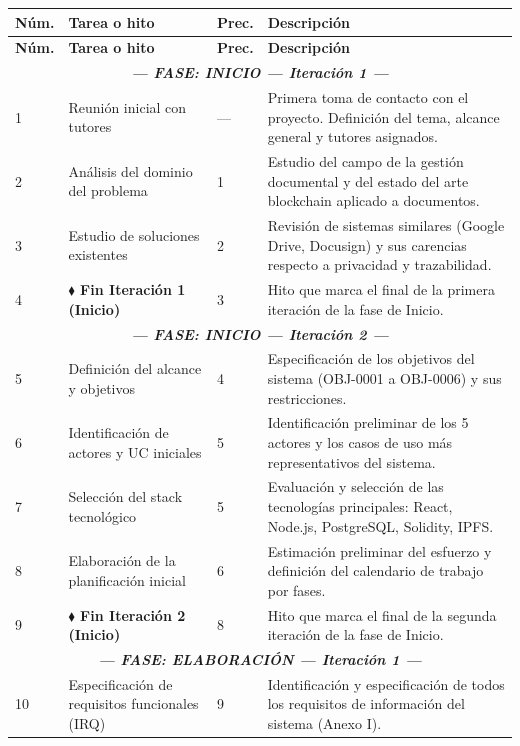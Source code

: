 \documentclass[11pt, a4paper]{article}
\begin{document}
\begin{longtable}{|p{1cm}|p{5.5cm}|p{1.5cm}|p{5.5cm}|}
\hline
\textbf{Núm.} & \textbf{Tarea o hito} & \textbf{Prec.} & \textbf{Descripción} \\
\hline
\endfirsthead
\hline
\textbf{Núm.} & \textbf{Tarea o hito} & \textbf{Prec.} & \textbf{Descripción} \\
\hline
\endhead
\multicolumn{4}{|c|}{\textit{\textbf{--- FASE: INICIO --- Iteración 1 ---}}} \\
\hline
1 & Reunión inicial con tutores & --- & Primera toma de contacto con el proyecto. Definición del tema, alcance general y tutores asignados. \\
\hline
2 & Análisis del dominio del problema & 1 & Estudio del campo de la gestión documental y del estado del arte blockchain aplicado a documentos. \\
\hline
3 & Estudio de soluciones existentes & 2 & Revisión de sistemas similares (Google Drive, Docusign) y sus carencias respecto a privacidad y trazabilidad. \\
\hline
4 & \textbf{$\blacklozenge$ Fin Iteración 1 (Inicio)} & 3 & Hito que marca el final de la primera iteración de la fase de Inicio. \\
\hline
\multicolumn{4}{|c|}{\textit{\textbf{--- FASE: INICIO --- Iteración 2 ---}}} \\
\hline
5 & Definición del alcance y objetivos & 4 & Especificación de los objetivos del sistema (OBJ-0001 a OBJ-0006) y sus restricciones. \\
\hline
6 & Identificación de actores y UC iniciales & 5 & Identificación preliminar de los 5 actores y los casos de uso más representativos del sistema. \\
\hline
7 & Selección del stack tecnológico & 5 & Evaluación y selección de las tecnologías principales: React, Node.js, PostgreSQL, Solidity, IPFS. \\
\hline
8 & Elaboración de la planificación inicial & 6 & Estimación preliminar del esfuerzo y definición del calendario de trabajo por fases. \\
\hline
9 & \textbf{$\blacklozenge$ Fin Iteración 2 (Inicio)} & 8 & Hito que marca el final de la segunda iteración de la fase de Inicio. \\
\hline
\multicolumn{4}{|c|}{\textit{\textbf{--- FASE: ELABORACIÓN --- Iteración 1 ---}}} \\
\hline
10 & Especificación de requisitos funcionales (IRQ) & 9 & Identificación y especificación de todos los requisitos de información del sistema (Anexo I). \\

\end{longtable}
\end{document}

